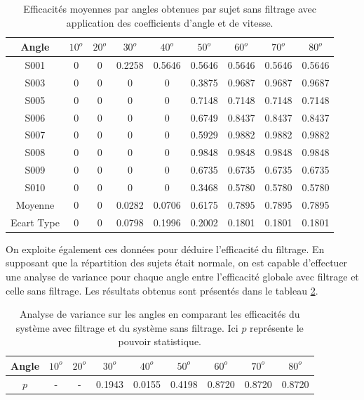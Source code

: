 \documentclass[letterpaper, twoside, 12pt, memoire, creativecommons, hyperref]{thETS}
\begin{document}
\begin{table}[ht]
	\caption{Efficacités moyennes par angles obtenues par sujet sans filtrage avec application des coefficients d'angle et de vitesse. }
		\begin{tabular}{|c|c|c|c|c|c|c|c|c|}
		\hline
			Angle & $10^{o}$ & $20^{o}$ & $30^{o}$ & $40^{o}$ & $50^{o}$ & $60^{o}$ & $70^{o}$ & $80^{o}$\\
	    \hline
	    		S001 & 0 & 0 & 0.2258 & 0.5646 & 0.5646 & 0.5646 & 0.5646 & 0.5646\\
	    \hline
	    		S003 & 0 & 0 & 0 & 0 & 0.3875 & 0.9687 & 0.9687 & 0.9687\\
	    \hline
	    		S005 & 0 & 0 & 0 & 0 & 0.7148 & 0.7148 & 0.7148 & 0.7148\\
	    \hline
	    		S006 & 0 & 0 & 0 & 0 & 0.6749 & 0.8437 & 0.8437 & 0.8437\\
	    \hline
	    		S007 & 0 & 0 & 0 & 0 & 0.5929 & 0.9882 & 0.9882 & 0.9882\\
	    \hline
	    		S008 & 0 & 0 & 0 & 0 & 0.9848 & 0.9848 & 0.9848 & 0.9848\\
	    \hline
	    		S009 & 0 & 0 & 0 & 0 & 0.6735 & 0.6735 & 0.6735 & 0.6735\\
	    \hline
	    		S010 & 0 & 0 & 0 & 0 & 0.3468 & 0.5780 & 0.5780 & 0.5780\\
	    \hline
	    		Moyenne & 0 & 0 & 0.0282 & 0.0706 & 0.6175 & 0.7895 & 0.7895 & 0.7895\\
	    \hline
	    		Ecart Type & 0 & 0 & 0.0798 & 0.1996 & 0.2002 & 0.1801 & 0.1801 & 0.1801\\
	    \hline
		\end{tabular}
	\label{tab:effFanglecoeff}
\end{table}

On exploite également ces données pour déduire l'efficacité du filtrage. En supposant que la répartition des sujets était normale, on est capable d'effectuer une analyse de variance pour chaque angle entre l'efficacité globale avec filtrage et celle sans filtrage. Les résultats obtenus sont présentés dans le tableau \ref{tab:anova}. 

\begin{table}[ht]
	\caption{Analyse de variance sur les angles en comparant les efficacités du système avec filtrage et du système sans filtrage. Ici $p$ représente le pouvoir statistique.}
		\begin{tabular}{|c|c|c|c|c|c|c|c|c|}
		\hline
			Angle & $10^{o}$ & $20^{o}$ & $30^{o}$ & $40^{o}$ & $50^{o}$ & $60^{o}$ & $70^{o}$ & $80^{o}$\\
	    \hline
	    		$p$ &  - & - & 0.1943 & 0.0155 & 0.4198 & 0.8720 & 0.8720 & 0.8720\\
	    \hline
		\end{tabular}
	\label{tab:anova}
\end{table}
\end{document}
